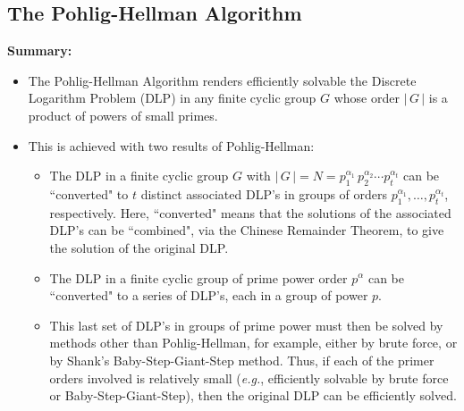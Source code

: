\subsection{The Pohlig-Hellman Algorithm}

\noindent
\textbf{Summary:}
\begin{itemize}
\item	The Pohlig-Hellman Algorithm renders efficiently solvable the Discrete Logarithm Problem (DLP) in any
		finite cyclic group $G$ whose order $\vert\,G\,\vert$ is a product of powers of small primes.
\item	This is achieved with two results of Pohlig-Hellman:
		\begin{itemize}
		\item	The DLP in a finite cyclic group $G$ with
				$\vert\,G\,\vert = N = p_{1}^{\alpha_{1}}\,p_{2}^{\alpha_{2}} \cdots p_{t}^{\alpha_{t}}$
				can be ``converted" to $t$ distinct associated DLP's in groups of orders
				$p_{1}^{\alpha_{1}}, \ldots, p_{t}^{\alpha_{t}}$, respectively.
				Here, ``converted" means that the solutions of the associated DLP's can be ``combined",
				via the Chinese Remainder Theorem, to give the solution of the original DLP.
		\item	The DLP in a finite cyclic group of prime power order $p^{\alpha}$ can be ``converted" to
				a series of DLP's, each in a group of power $p$.
		\item	This last set of DLP's in groups of prime power must then be solved by methods other than
				Pohlig-Hellman, for example, either by brute force, or by Shank's Baby-Step-Giant-Step method.
				Thus, if each of the primer orders involved is relatively small
				(\textit{e.g.}, efficiently solvable by brute force or Baby-Step-Giant-Step),
				then the original DLP can be efficiently solved.
		\end{itemize}
\end{itemize}

